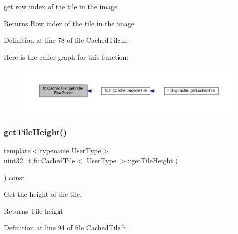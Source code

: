 get row index of the tile in the image 

\begin{DoxyReturn}{Returns}
Row index of the tile in the image 
\end{DoxyReturn}


Definition at line 78 of file Cached\+Tile.\+h.

Here is the caller graph for this function\+:
\nopagebreak
\begin{figure}[H]
\begin{center}
\leavevmode
\includegraphics[width=350pt]{d0/dbc/classfi_1_1CachedTile_a970c5b3cb066030fee17e9c60b9814ab_icgraph}
\end{center}
\end{figure}
\mbox{\label{classfi_1_1CachedTile_ae83ddf4e93fd9ba481b9edd05384dcc2}} 
\subsubsection{\texorpdfstring{get\+Tile\+Height()}{getTileHeight()}}
{\footnotesize\ttfamily template$<$typename User\+Type$>$ \\
uint32\+\_\+t \hyperlink{classfi_1_1CachedTile}{fi\+::\+Cached\+Tile}$<$ User\+Type $>$\+::get\+Tile\+Height (\begin{DoxyParamCaption}{ }\end{DoxyParamCaption}) const\hspace{0.3cm}{\ttfamily [inline]}}



Get the height of the tile. 

\begin{DoxyReturn}{Returns}
Tile height 
\end{DoxyReturn}


Definition at line 94 of file Cached\+Tile.\+h.

\mbox{\label{classfi_1_1CachedTile_acfc950d0ebe9da5cc6c67af567526d4f}} 
